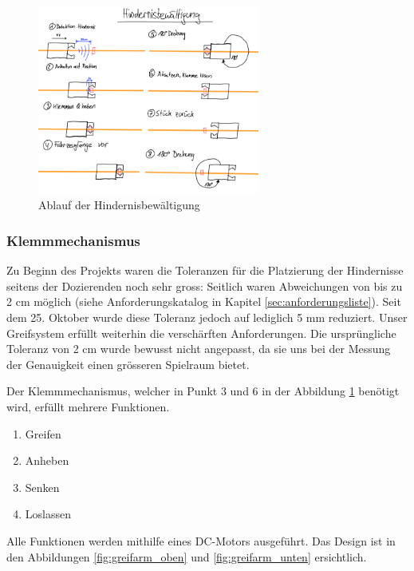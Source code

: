 \documentclass[../main.tex]{subfiles}
\begin{document}
\begin{figure}[H]
\centering
\includegraphics[width=0.65\textwidth]{img/lösungskonzpet/Skizzen/Skizze_Hindernisbewältigung.png}
\caption{Ablauf der Hindernisbewältigung}
\label{img:Skizze_Hindernisbewältigung}
\end{figure}


\subsubsection{Klemmmechanismus}

Zu Beginn des Projekts waren die Toleranzen für die Platzierung der Hindernisse seitens der Dozierenden noch sehr gross: Seitlich waren Abweichungen von bis zu 2 cm möglich (siehe Anforderungskatalog in Kapitel \ref{sec:anforderungsliste}). Seit dem 25. Oktober wurde diese Toleranz jedoch auf lediglich 5 mm reduziert. Unser Greifsystem erfüllt weiterhin die verschärften Anforderungen. Die ursprüngliche Toleranz von 2 cm wurde bewusst nicht angepasst, da sie uns bei der Messung der Genauigkeit einen grösseren Spielraum bietet.

Der Klemmmechanismus, welcher in Punkt 3 und 6 in der Abbildung \ref{img:Skizze_Hindernisbewältigung} benötigt wird, erfüllt mehrere Funktionen.

\begin{enumerate}
    \item Greifen
    \item Anheben
    \item Senken
    \item Loslassen
\end{enumerate}

Alle Funktionen werden mithilfe eines DC-Motors ausgeführt. Das Design ist in den Abbildungen \ref{fig:greifarm_oben} und \ref{fig:greifarm_unten} ersichtlich.
\newline
\end{document}
